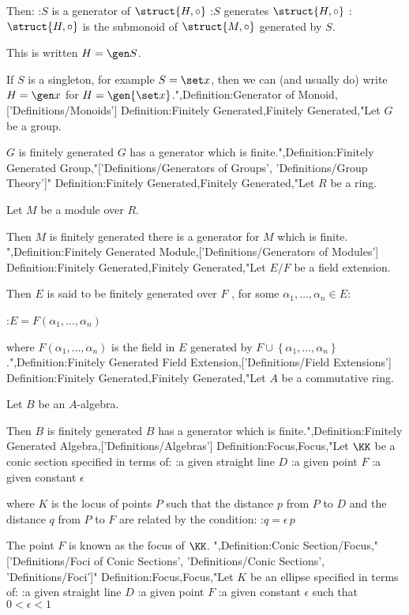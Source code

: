 Then:
:$S$ is a generator of $\struct {H, \circ}$
:$S$ generates $\struct {H, \circ}$
:$\struct {H, \circ}$ is the submonoid of $\struct {M, \circ}$ generated by $S$.


This is written $H = \gen S$.


If $S$ is a singleton, for example $S = \set x$, then we can (and usually do) write $H = \gen x$ for $H = \gen {\set x}$.",Definition:Generator of Monoid,['Definitions/Monoids']
Definition:Finitely Generated,Finitely Generated,"Let $G$ be a group.


$G$ is finitely generated  $G$ has a generator which is finite.",Definition:Finitely Generated Group,"['Definitions/Generators of Groups', 'Definitions/Group Theory']"
Definition:Finitely Generated,Finitely Generated,"Let $R$ be a ring.

Let $M$ be a module over $R$.


Then $M$ is finitely generated  there is a generator for $M$ which is finite.
",Definition:Finitely Generated Module,['Definitions/Generators of Modules']
Definition:Finitely Generated,Finitely Generated,"Let $E / F$ be a field extension.


Then $E$ is said to be finitely generated over $F$ , for some $\alpha_1, \ldots, \alpha_n \in E$:

:$E = F \left({\alpha_1, \ldots, \alpha_n}\right)$ 

where $F \left({\alpha_1, \ldots, \alpha_n}\right)$ is the field in $E$ generated by $F \cup \left\{{\alpha_1, \ldots, \alpha_n}\right\}$.",Definition:Finitely Generated Field Extension,['Definitions/Field Extensions']
Definition:Finitely Generated,Finitely Generated,"Let $A$ be a commutative ring.

Let $B$ be an $A$-algebra.


Then $B$ is finitely generated  $B$ has a generator which is finite.",Definition:Finitely Generated Algebra,['Definitions/Algebras']
Definition:Focus,Focus,"Let $\KK$ be a conic section specified in terms of:
:a given straight line $D$
:a given point $F$
:a given constant $\epsilon$

where $K$ is the locus of points $P$ such that the distance $p$ from $P$ to $D$ and the distance $q$ from $P$ to $F$ are related by the condition:
:$q = \epsilon \, p$


The point $F$ is known as the focus of $\KK$.
",Definition:Conic Section/Focus,"['Definitions/Foci of Conic Sections', 'Definitions/Conic Sections', 'Definitions/Foci']"
Definition:Focus,Focus,"Let $K$ be an ellipse specified in terms of:
:a given straight line $D$
:a given point $F$
:a given constant $\epsilon$ such that $0 < \epsilon < 1$

